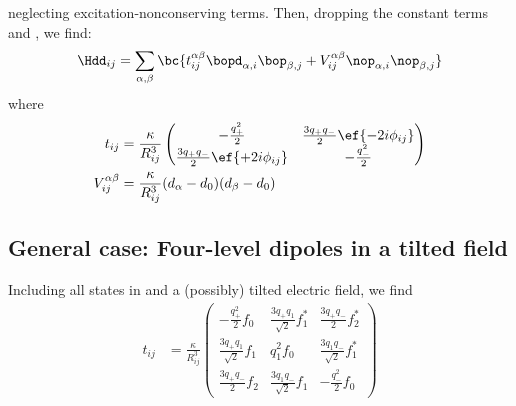 neglecting excitation-nonconserving terms. Then, dropping the constant terms and , we find:
\begin{align}
    \Hdd_{ij} = \sum_{\alpha,\beta} \bc{ t_{ij}^{\alpha\beta} \bopd_{\alpha,i} \bop_{\beta,j} + V_{ij}^{\alpha\beta} \nop_{\alpha,i} \nop_{\beta,j} }
\end{align}
where
\begin{align}
    t_{ij} &= \frac{\kappa}{R_{ij}^3} \begin{pmatrix}
    -\frac{q_+^2}{2} & \frac{3q_+q_-}{2} \ef{-2i \phi_{ij}} \\
    \frac{3q_+q_-}{2} \ef{+2i \phi_{ij}} & -\frac{q_-^2}{2}
\end{pmatrix} \\
    V_{ij}^{\alpha\beta} &= \frac{\kappa}{R_{ij}^3} (d_\alpha-d_0)(d_\beta-d_0)
\end{align}

\subsection{General case: Four-level dipoles in a tilted field}
Including all states in  and a (possibly) tilted electric field, we find
\begin{align}
    t_{ij} &= \frac{\kappa}{R_{ij}^3} \begin{pmatrix}
    -\frac{q_+^2}{2} f_0 & \frac{3q_+ q_1}{\sqrt{2}} f_1^* & \frac{3q_+q_-}{2} f_2^* \\
    \frac{3q_+q_1}{\sqrt{2}} f_1 & q_1^2 f_0 & \frac{3q_1q_-}{\sqrt{2}} f_1^* \\
    \frac{3q_+q_-}{2} f_2 & \frac{3q_1q_-}{\sqrt{2}} f_1 & -\frac{q_-^2}{2} f_0
\end{pmatrix}
\end{align}
